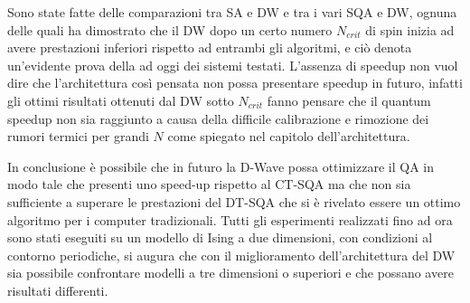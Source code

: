 Sono state fatte delle comparazioni tra SA e DW\cite{DDQS} e tra i vari SQA e DW\cite{QVC}, ognuna delle quali ha dimostrato che il DW dopo un certo numero $N_{crit}$ di spin inizia ad avere prestazioni inferiori rispetto ad entrambi gli algoritmi, e ciò denota un'evidente prova della  ad oggi dei sistemi testati. L'assenza di speedup non vuol dire che l'architettura così pensata non possa presentare speedup in futuro, infatti gli ottimi risultati ottenuti dal DW sotto $N_{crit}$ fanno pensare che il quantum speedup non sia raggiunto a causa della difficile calibrazione e rimozione dei rumori termici per grandi $N$ come spiegato nel capitolo dell'architettura.

In conclusione è possibile che in futuro la D-Wave possa ottimizzare il QA in modo tale che presenti uno speed-up rispetto al CT-SQA ma che non sia sufficiente a superare le prestazioni del DT-SQA che si è rivelato essere un ottimo algoritmo per i computer tradizionali. Tutti gli esperimenti realizzati fino ad ora sono stati eseguiti su un modello di Ising a due dimensioni, con condizioni al contorno periodiche, si augura che con il miglioramento dell'architettura del DW sia possibile confrontare modelli a tre dimensioni o superiori e che possano avere risultati differenti.
